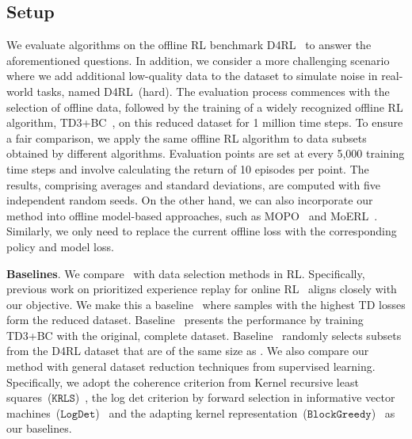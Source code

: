 
\subsection{Setup}
We evaluate algorithms on the offline RL benchmark D4RL~\citep{fu2020d4rl} to answer the aforementioned questions.
In addition, we consider a more challenging scenario where we add additional low-quality data to the dataset to simulate noise in real-world tasks, named D4RL~(hard).
The evaluation process commences with the selection of offline data, followed by the training of a widely recognized offline RL algorithm, TD3+BC~\citep{fujimoto2021minimalist}, on this reduced dataset for 1 million time steps.
To ensure a fair comparison, we apply the same offline RL algorithm to data subsets obtained by different algorithms. 
Evaluation points are set at every 5,000 training time steps and involve calculating the return of 10 episodes per point.
The results, comprising averages and standard deviations, are computed with five independent random seeds.
On the other hand, we can also incorporate our method into offline model-based approaches, such as MOPO~\citep{yu2020mopo} and MoERL~\citep{kidambi2020morel}.
Similarly, we only need to replace the current offline loss with the corresponding policy and model loss.

\textbf{Baselines}. 
We compare \name~with data selection methods in RL.
Specifically, previous work on prioritized experience replay for online RL~\citep{schaul2015prioritized} aligns closely with our objective. 
We make this a baseline \namep~where samples with the highest TD losses form the reduced dataset. 
Baseline \nameo~presents the performance by training TD3+BC with the original, complete dataset. 
Baseline \namer~randomly selects subsets from the D4RL dataset that are of the same size as \name.
We also compare our method with general dataset reduction techniques from supervised learning.
Specifically, we adopt the coherence criterion from Kernel recursive least squares~($\mathtt{KRLS}$)~\citep{engel2004kernel}, the log det criterion by forward selection in informative vector machines~($\mathtt{LogDet}$)~\citep{seeger2004greedy} and the adapting kernel representation~($\mathtt{BlockGreedy}$)~\citep{schlegel2017adapting} as our baselines.

